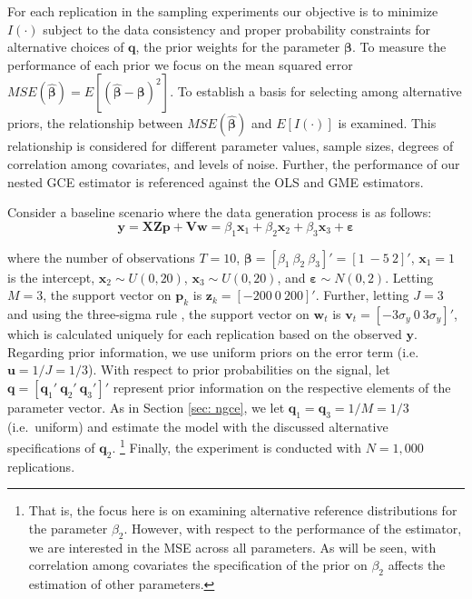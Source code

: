 \documentclass[english]{article}
\begin{document}
For each replication in the sampling experiments our objective is to minimize 
$I(\cdot)$ subject to the data consistency and proper probability constraints 
for alternative choices of $\mathbf{q}$, the prior weights for the parameter 
$\mathbf{\beta}$. 
To measure the performance of each prior we focus on the mean squared 
error $MSE(\hat{\mathbf{\beta}}) = E[(\hat{\mathbf{\beta}}- 
\mathbf{\beta})^2]$.
To establish a basis for selecting among alternative priors, the relationship 
between $MSE(\hat{\mathbf{\beta}})$ and $E[I(\cdot)]$ is examined.
This relationship is considered for different parameter values, sample sizes, 
degrees of correlation among covariates, and levels of noise.
Further, the performance of our nested GCE estimator is referenced 
against the OLS and GME estimators.

Consider a baseline scenario where the data generation process is as follows:
\begin{equation}
\mathbf{y} = \mathbf{XZp} + \mathbf{Vw}
= \beta_1\mathbf{x}_1 + \beta_2\mathbf{x}_2
+ \beta_3\mathbf{x}_3 + \mathbf{\varepsilon} 
\end{equation}

\noindent
where the number of observations $T=10$, $\mathbf{\beta}= [\beta_1 ~
\beta_2 ~ \beta_3]'=[1 ~ -5 ~ 2]'$, $\mathbf{x}_1=1$ is the intercept, 
$\mathbf{x}_2 \sim U(0,20)$, $\mathbf{x}_3 \sim U(0,20)$, and 
$\mathbf{\varepsilon}\sim N(0,2)$.
Letting $M=3$, the support vector on $\mathbf{p}_k$ is $\mathbf{z}_k 
= [- 200 ~ 0 ~ 200]'$.
Further, letting $J=3$ and using the three-sigma rule 
\citep{pukelsheim1994}, the support vector on $\mathbf{w}_t$ is 
$\mathbf{v}_t = [- 3\sigma_y ~ 0 ~ 3\sigma_y]'$, which is calculated 
uniquely for each replication based on the observed $\mathbf{y}$.
Regarding prior information, we use uniform priors on the error term (i.e.\ 
$\mathbf{u} = 1/J = 1/3$).
With respect to prior probabilities on the signal, let $\mathbf{q} = 
[\mathbf{q}_1' ~ \mathbf{q}_2' ~ \mathbf{q}_3']'$ represent prior 
information on the respective elements of the parameter vector.
As in Section \ref{sec: ngce}, we let $\mathbf{q}_1 = \mathbf{q}_3 = 1/M 
= 1/3$ (i.e.\ uniform) and estimate the model with the discussed alternative 
specifications of $\mathbf{q}_2$.%
\footnote{That is, the focus here is on examining alternative reference 
distributions for the parameter $\beta_2$. 
However, with respect to the performance of the estimator, we are 
interested in the MSE across all parameters.
As will be seen, with correlation among covariates the specification of the 
prior on $\beta_2$ affects the estimation of other parameters.}
Finally, the experiment is conducted with $N=1,000$ replications.
\end{document}
